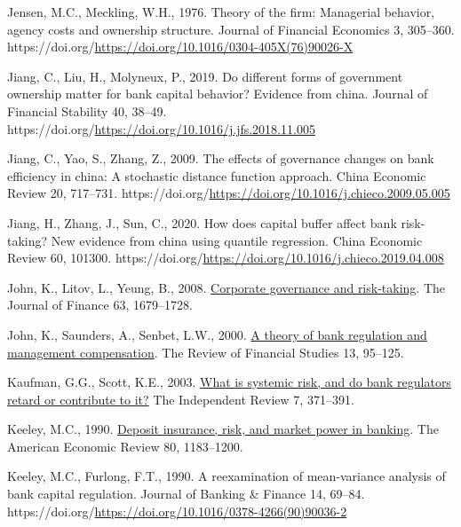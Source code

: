 \documentclass[
  12pt,
  a4paper,
  DIV=11,
  numbers=noendperiod]{scrreprt}
\newlength{\cslhangindent}
\newenvironment{CSLReferences}[2] %
 {\begin{list}{}{%
  \setlength{\itemindent}{0pt}
  \setlength{\leftmargin}{0pt}
  \setlength{\parsep}{0pt}
  \ifodd #1
   \setlength{\leftmargin}{\cslhangindent}
   \setlength{\itemindent}{-1\cslhangindent}
  \fi
  \setlength{\itemsep}{#2\baselineskip}}}
 {\end{list}}
\begin{document}
\begin{CSLReferences}{1}{0}
Jensen, M.C., Meckling, W.H., 1976. Theory of the firm: Managerial
behavior, agency costs and ownership structure. Journal of Financial
Economics 3, 305--360.
https://doi.org/\url{https://doi.org/10.1016/0304-405X(76)90026-X}

Jiang, C., Liu, H., Molyneux, P., 2019. Do different forms of government
ownership matter for bank capital behavior? Evidence from china. Journal
of Financial Stability 40, 38--49.
https://doi.org/\url{https://doi.org/10.1016/j.jfs.2018.11.005}

Jiang, C., Yao, S., Zhang, Z., 2009. The effects of governance changes
on bank efficiency in china: A stochastic distance function approach.
China Economic Review 20, 717--731.
https://doi.org/\url{https://doi.org/10.1016/j.chieco.2009.05.005}

Jiang, H., Zhang, J., Sun, C., 2020. How does capital buffer affect bank
risk-taking? New evidence from china using quantile regression. China
Economic Review 60, 101300.
https://doi.org/\url{https://doi.org/10.1016/j.chieco.2019.04.008}

John, K., Litov, L., Yeung, B., 2008.
\href{http://www.jstor.org.queens.ezp1.qub.ac.uk/stable/25094487}{Corporate
governance and risk-taking}. The Journal of Finance 63, 1679--1728.

John, K., Saunders, A., Senbet, L.W., 2000.
\href{http://www.jstor.org.queens.ezp1.qub.ac.uk/stable/2646082}{A
theory of bank regulation and management compensation}. The Review of
Financial Studies 13, 95--125.

Kaufman, G.G., Scott, K.E., 2003.
\href{http://www.jstor.org/stable/24562449}{What is systemic risk, and
do bank regulators retard or contribute to it?} The Independent Review
7, 371--391.

Keeley, M.C., 1990.
\href{http://www.jstor.org.queens.ezp1.qub.ac.uk/stable/2006769}{Deposit
insurance, risk, and market power in banking}. The American Economic
Review 80, 1183--1200.

Keeley, M.C., Furlong, F.T., 1990. A reexamination of mean-variance
analysis of bank capital regulation. Journal of Banking \& Finance 14,
69--84.
https://doi.org/\url{https://doi.org/10.1016/0378-4266(90)90036-2}


\end{CSLReferences}
\end{document}
